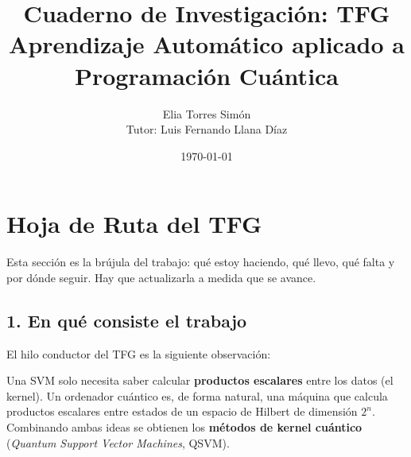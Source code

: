 \documentclass[12pt, a4paper]{article}
\title{\textbf{Cuaderno de Investigación: TFG}\\ \large Aprendizaje Automático aplicado a Programación Cuántica}
\author{Elia Torres Simón \\ \small Tutor: Luis Fernando Llana Díaz}
\date{\today}
\begin{document}
\maketitle

\tableofcontents
\newpage

\section*{Hoja de Ruta del TFG}

\noindent Esta sección es la brújula del trabajo: qué estoy haciendo, qué llevo, qué falta y por dónde seguir. Hay que actualizarla a medida que se avance.

\subsection*{1. En qué consiste el trabajo}

\noindent El hilo conductor del TFG es la siguiente observación:

\begin{tcolorbox}[colback=teal!5!white,colframe=teal!75!black,title=\textbf{Idea central}]
Una SVM solo necesita saber calcular \textbf{productos escalares} entre los datos (el kernel). Un ordenador cuántico es, de forma natural, una máquina que calcula productos escalares entre estados de un espacio de Hilbert de dimensión $2^n$. Combinando ambas ideas se obtienen los \textbf{métodos de kernel cuántico} (\textit{Quantum Support Vector Machines}, QSVM).
\end{tcolorbox}
\end{document}
